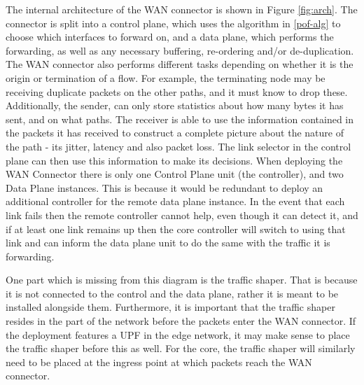 The internal architecture of the WAN connector is shown in Figure \ref{fig:arch}. The connector is split into a control plane, which uses the algorithm in \ref{pof-alg} to choose which interfaces to forward on, and a data plane, which performs the forwarding, as well as any necessary buffering, re-ordering and/or de-duplication. The WAN connector also performs different tasks depending on whether it is the origin or termination of a flow. For example, the terminating node may be receiving duplicate packets on the other paths, and it must know to drop these. Additionally, the sender, can only store statistics about how many bytes it has sent, and on what paths. The receiver is able to use the information contained in the packets it has received to construct a complete picture about the nature of the path - its jitter, latency and also packet loss. The link selector in the control plane can then use this information to make its decisions. When deploying the WAN Connector there is only one Control Plane unit (the controller), and two Data Plane instances. This is because it would be redundant to deploy an additional controller for the remote data plane instance. In the event that each link fails then the remote controller cannot help, even though it can detect it, and if at least one link remains up then the core controller will switch to using that link and can inform the data plane unit to do the same with the traffic it is forwarding.

One part which is missing from this diagram is the traffic shaper. That is because it is not connected to the control and the data plane, rather it is meant to be installed alongside them. Furthermore, it is important that the traffic shaper resides in the part of the network before the packets enter the WAN connector. If the deployment features a UPF in the edge network, it may make sense to place the traffic shaper before this as well. For the core, the traffic shaper will similarly need to be placed at the ingress point at which packets reach the WAN connector.






























